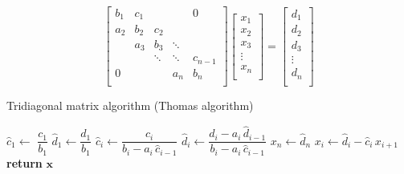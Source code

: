 \documentclass[border=10pt]{article}
\begin{document}
  \begin{equation}
    \begin{bmatrix}{b_{1}}&{c_{1}}&{}&{}&{0}\\
      {a_{2}}&{b_{2}}&{c_{2}}&{}&{}\\
      {}&{a_{3}}&{b_{3}}&\ddots &{}\\
      {}&{}&\ddots &\ddots &{c_{n-1}}\\
      {0}&{}&{}&{a_{n}}&{b_{n}}\\
      \end{bmatrix}
      \begin{bmatrix}{x_{1}}\\
      {x_{2}}\\{x_{3}}\\\vdots \\
      {x_{n}}\\
      \end{bmatrix}
      =
      \begin{bmatrix}{d_{1}}\\
      {d_{2}}\\{d_{3}}\\
      \vdots \\{d_{n}}\\
    \end{bmatrix}
  \end{equation}

\begin{algorithm}\caption{Tridiagonal matrix algorithm (Thomas algorithm)}\label{TDMA}
  \setlength{\lineskip}{7pt}
  \begin{algorithmic}[1]
      \State $\hat c_1 \gets$ $ \dfrac{c_1}{b_1}$
      \State $\hat d_1 \gets \dfrac{d_1}{b_1}$
        \State $\hat c_i \gets \dfrac{c_i}{b_i-a_i \, \hat c_{i-1}}$
        \State $\hat d_i \gets \dfrac{d_i - a_i \, \hat d_{i-1}}{b_i-a_i \, \hat c_{i-1}}$
      \EndFor
      \State $x_n \gets \hat d_n$
        \State $x_i \gets \hat d_i - \hat c_i \, x_{i+1}$
      \EndFor
      \State \textbf{return} $\textbf{x}$
    \EndFunction
  \end{algorithmic}
\end{algorithm}
\end{document}
